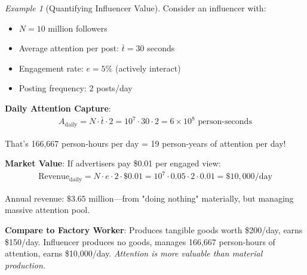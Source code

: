 \documentclass[11pt,a4paper]{article}
\theoremstyle{definition}
\theoremstyle{remark}
\newtheorem{example}{Example}[section]
\begin{document}
\begin{example}[Quantifying Influencer Value]
Consider an influencer with:
\begin{itemize}
    \item \(N = 10\) million followers
    \item Average attention per post: \(\bar{t} = 30\) seconds
    \item Engagement rate: \(e = 5\%\) (actively interact)
    \item Posting frequency: 2 posts/day
\end{itemize}

\textbf{Daily Attention Capture}:
\begin{align}
A_{\text{daily}} = N \cdot \bar{t} \cdot 2 = 10^7 \cdot 30 \cdot 2 = 6 \times 10^8 \text{ person-seconds}
\end{align}

That's 166,667 person-hours per day = 19 person-years of attention per day!

\textbf{Market Value}: If advertisers pay \$0.01 per engaged view:
\begin{align}
\text{Revenue}_{\text{daily}} = N \cdot e \cdot 2 \cdot \$0.01 = 10^7 \cdot 0.05 \cdot 2 \cdot 0.01 = \$10,000/\text{day}
\end{align}

Annual revenue: \(\$3.65\) million—from "doing nothing" materially, but managing massive attention pool.

\textbf{Compare to Factory Worker}: Produces tangible goods worth \$200/day, earns \$150/day. Influencer produces no goods, manages 166,667 person-hours of attention, earns \$10,000/day. \textit{Attention is more valuable than material production.}
\end{example}
\end{document}
